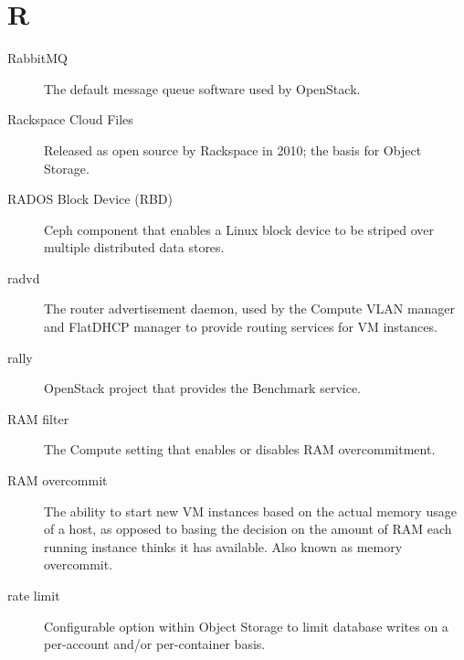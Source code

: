 \documentclass[letterpaper,10pt,english]{sphinxmanual}
\begin{document}
\section{R}
\label{_source/glossary:r}\begin{description}
\item[{RabbitMQ}] \leavevmode{}\label{_source/glossary:term-rabbitmq}
The default message queue software used by OpenStack.

\item[{Rackspace Cloud Files}] \leavevmode{}\label{_source/glossary:term-rackspace-cloud-files}
Released as open source by Rackspace in 2010; the basis for
Object Storage.

\item[{RADOS Block Device (RBD)}] \leavevmode{}\label{_source/glossary:term-rados-block-device-rbd}
Ceph component that enables a Linux block device to be striped
over multiple distributed data stores.

\item[{radvd}] \leavevmode{}\label{_source/glossary:term-radvd}
The router advertisement daemon, used by the Compute VLAN
manager and FlatDHCP manager to provide routing services for VM
instances.

\item[{rally}] \leavevmode{}\label{_source/glossary:term-rally}
OpenStack project that provides the Benchmark service.

\item[{RAM filter}] \leavevmode{}\label{_source/glossary:term-ram-filter}
The Compute setting that enables or disables RAM
overcommitment.

\item[{RAM overcommit}] \leavevmode{}\label{_source/glossary:term-ram-overcommit}
The ability to start new VM instances based on the actual memory
usage of a host, as opposed to basing the decision on the amount of
RAM each running instance thinks it has available. Also known as
memory overcommit.

\item[{rate limit}] \leavevmode{}\label{_source/glossary:term-rate-limit}
Configurable option within Object Storage to limit database
writes on a per-account and/or per-container basis.


\end{description}
\end{document}
